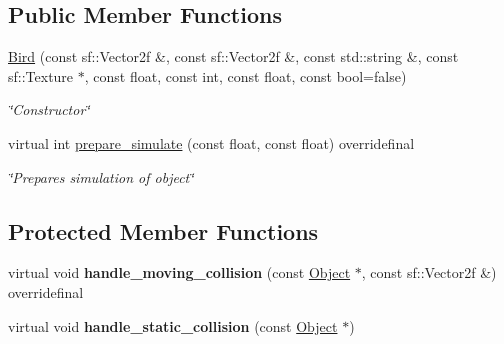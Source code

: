 \subsection*{Public Member Functions}
\begin{DoxyCompactItemize}
\item 
\hyperlink{classBird_afe65295d7e648178245a1cd784924ecd}{Bird} (const sf\+::\+Vector2f \&, const sf\+::\+Vector2f \&, const std\+::string \&, const sf\+::\+Texture $\ast$, const float, const int, const float, const bool=false)
\begin{DoxyCompactList}\small\item\em \char`\"{}\+Constructor\char`\"{} \end{DoxyCompactList}\item 
virtual int \hyperlink{classBird_af2882ba302f03c5bdf5950cc21a39f66}{prepare\+\_\+simulate} (const float, const float) overridefinal
\begin{DoxyCompactList}\small\item\em \char`\"{}\+Prepares simulation of object\char`\"{} \end{DoxyCompactList}\end{DoxyCompactItemize}
\subsection*{Protected Member Functions}
\begin{DoxyCompactItemize}
\item 
\hypertarget{classBird_a3802ec1a4d2886ef8c95dd6d76038ab6}{virtual void {\bfseries handle\+\_\+moving\+\_\+collision} (const \hyperlink{classObject}{Object} $\ast$, const sf\+::\+Vector2f \&) overridefinal}\label{classBird_a3802ec1a4d2886ef8c95dd6d76038ab6}

\item 
\hypertarget{classBird_adbcfe9b09d3b828ce00982ec1aab9c6e}{virtual void {\bfseries handle\+\_\+static\+\_\+collision} (const \hyperlink{classObject}{Object} $\ast$)}\label{classBird_adbcfe9b09d3b828ce00982ec1aab9c6e}

\end{DoxyCompactItemize}

